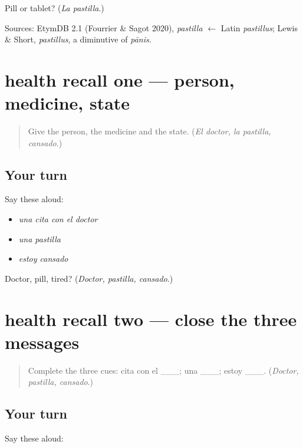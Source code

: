 \begin{tcolorbox}[breakable,colback=teal!4,colframe=teal!35!black,title={Before you move on}]
Pill or tablet? (\emph{La pastilla}.)

Sources: EtymDB 2.1 (Fourrier \& Sagot 2020), \emph{pastilla} $\leftarrow$ Latin \emph{pastillus}; Lewis \& Short, \emph{pastillus}, a diminutive of \emph{pānis}.
\end{tcolorbox}
\section[(review)]{health recall one — person, medicine, state}

\label{lesson:ES-C408-health-recall-1}



\begin{quote}
Give the person, the medicine and the state. (\emph{El doctor, la pastilla, cansado}.)
\end{quote}

\subsection*{Your turn}
Say these aloud:

\begin{itemize}
\raggedright
  \item \emph{una cita con el doctor}
  \item \emph{una pastilla}
  \item \emph{estoy cansado}
\end{itemize}

\begin{tcolorbox}[breakable,colback=teal!4,colframe=teal!35!black,title={Before you move on}]
Doctor, pill, tired? (\emph{Doctor, pastilla, cansado}.)
\end{tcolorbox}
\section[(review)]{health recall two — close the three messages}

\label{lesson:ES-C408-health-recall-2}



\begin{quote}
Complete the three cues: cita con el \_\_\_; una \_\_\_; estoy \_\_\_. (\emph{Doctor, pastilla, cansado}.)
\end{quote}

\subsection*{Your turn}
Say these aloud:

